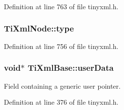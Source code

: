 Definition at line 763 of file tinyxml.h.

\hypertarget{classTiXmlNode_a2619c6379181c16ba95ae6922e2ca839}{
\subsubsection[{type}]{ {\bf TiXmlNode::type}}}
\label{d3/dd5/classTiXmlNode_a2619c6379181c16ba95ae6922e2ca839}


Definition at line 756 of file tinyxml.h.

\hypertarget{classTiXmlBase_ab242c01590191f644569fa89a080d97c}{
\subsubsection[{userData}]{\setlength{\rightskip}{0pt plus 5cm}void$\ast$ {\bf TiXmlBase::userData}}}
\label{d8/d47/classTiXmlBase_ab242c01590191f644569fa89a080d97c}


Field containing a generic user pointer. 



Definition at line 376 of file tinyxml.h.

